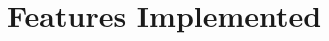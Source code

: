 \documentclass{article}
\newcommand{\centersec}[1]{\section*{\hfil #1 \hfil}}
\begin{document}

  \centersec{Features Implemented}
\end{document}
